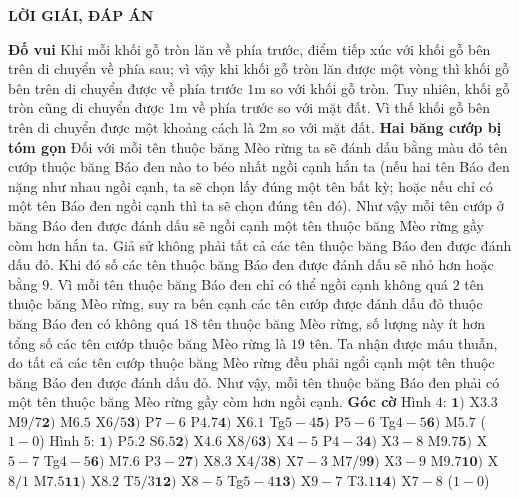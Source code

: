 \vspace*{10pt}
\centerline{\LARGE\textbf{\color{gocco}LỜI GIÁI, ĐÁP ÁN}} 
\begin{multicols}{2}
	\textbf{\color{gocco}Đố vui}
	\vskip 0.1cm
	Khi mỗi khối gỗ tròn lăn về phía trước, điểm tiếp xúc với khối gỗ bên trên di chuyển về phía sau; vì vậy khi khối gỗ tròn lăn được một vòng thì khối gỗ bên trên di chuyển được về phía trước $1$m so với khối gỗ tròn. Tuy nhiên, khối gỗ tròn cũng di chuyển được $1$m về phía trước so với mặt đất. Vì thế khối gỗ bên trên di chuyển được một khoảng cách là $2$m so với mặt đất. 
	\vskip 0.1cm
	\textbf{\color{gocco}Hai băng cướp bị tóm gọn}
	\vskip 0.1cm
	Đối với mỗi tên thuộc băng Mèo rừng ta sẽ đánh dấu bằng màu đỏ tên cướp thuộc băng Báo đen nào to béo nhất ngồi cạnh hắn ta (nếu hai tên Báo đen nặng như nhau ngồi cạnh, ta sẽ chọn lấy đúng một tên bất kỳ; hoặc nếu chỉ có một tên Báo đen ngồi cạnh thì ta sẽ chọn đúng tên đó). Như vậy mỗi tên cướp ở băng Báo đen được đánh dấu sẽ ngồi cạnh một tên thuộc băng Mèo rừng gầy còm hơn hắn ta.
	\vskip 0.1cm
	Giả sử không phải tất cả các tên thuộc băng Báo đen được đánh dấu đỏ. Khi đó số các tên thuộc băng Báo đen được đánh dấu sẽ nhỏ hơn hoặc bằng $9$. Vì mỗi tên thuộc băng Báo đen chỉ có thể ngồi cạnh không quá $2$ tên thuộc băng Mèo rừng, suy ra bên cạnh các tên cướp được đánh dấu đỏ thuộc băng Báo đen có không quá $18$ tên thuộc băng Mèo rừng, số lượng này ít hơn tổng số các tên cướp thuộc băng Mèo rừng là $19$ tên. Ta nhận được mâu thuẫn, do tất cả các tên cướp thuộc băng Mèo rừng đều phải ngổi cạnh một tên thuộc băng Báo đen được đánh dấu đỏ.
	\vskip 0.1cm
	Như vậy, mỗi tên thuộc băng Báo đen phải có một tên thuộc băng Mèo rừng gầy còm hơn ngồi cạnh.
	\vskip 0.1cm
	\textbf{\color{gocco}Góc cờ}
	\vskip 0.1cm
	Hình $4$: 
	\vskip 0.1cm
	$\pmb{1)}$ X$3.3$ M$9/7$\quad $\pmb{2)}$ M$6.5$ X$6/5$\quad $\pmb{3)}$ P$7-6$ P$4.7$\quad $\pmb{4)}$ X$6.1$  Tg$5-4$\quad  $\pmb{5)}$ P$5-6$ Tg$4-5$\quad $\pmb{6)}$ M$5.7$ ($1-0$)
	\vskip 0.1cm
	Hình $5$: $\pmb{1)}$ P$5.2$ S$6.5$\quad $\pmb{2)}$ X$4.6$ X$8/6$\quad  $\pmb{3)}$ X$4-5$ P$4-3$\quad $\pmb{4)}$ X$3-8$  M$9.7$\quad  $\pmb{5)}$ X$5-7$ Tg$4-5$\quad $\pmb{6)}$ M$7.6$ P$3-2$\quad $\pmb{7)}$ X$8.3$ X$4/3$\quad $\pmb{8)}$ X$7-3$ M$7/9$\quad $\pmb{9)}$ X$3-9$ M$9.7$\quad $\pmb{10)}$ X$8/1$ M$7.5$\quad  $\pmb{11)}$ X$8.2$ T$5/3$\quad $\pmb{12)}$ X$8-5$ Tg$5-4$\quad $\pmb{13)}$ X$9-7$ T$3.1$\quad $\pmb{14)}$ X$7-8$  ($1-0$)
\end{multicols}



